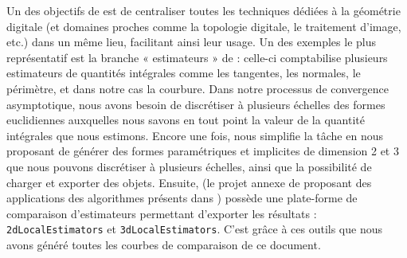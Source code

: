 Un des objectifs de \DGtal est de centraliser toutes les techniques dédiées à la
géométrie digitale (et domaines proches comme la topologie digitale, le
traitement d'image, etc.) dans un même lieu, facilitant ainsi leur usage. Un des
exemples le plus représentatif est la branche « estimateurs » de \DGtal :
celle-ci comptabilise plusieurs estimateurs de quantités intégrales comme
les tangentes, les normales, le périmètre, et dans notre cas la courbure. Dans
notre processus de convergence asymptotique, nous avons besoin de discrétiser à
plusieurs échelles des formes euclidiennes auxquelles nous savons en tout point
la valeur de la quantité intégrales que nous estimons. Encore une fois,
\DGtal nous simplifie la tâche en nous proposant de générer des formes
paramétriques et implicites de dimension 2 et 3 que nous pouvons discrétiser à
plusieurs échelles, ainsi que la possibilité de charger et exporter des objets.
Ensuite, \DGtalTools (le projet annexe de \DGtal proposant des applications des
algorithmes présents dans \DGtal) possède une plate-forme de comparaison
d'estimateurs permettant d'exporter les résultats : \texttt{2dLocalEstimators}
et \texttt{3dLocalEstimators}. C'est grâce à ces outils que nous avons généré
toutes les courbes de comparaison de ce document.

